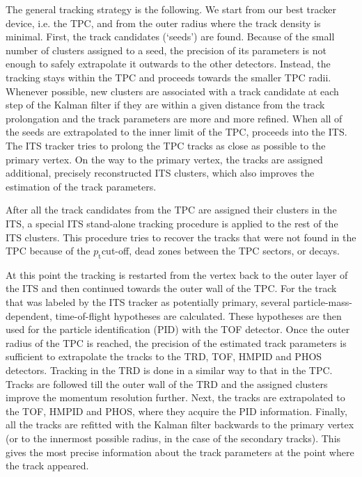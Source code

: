 \documentclass[12pt,a4paper,twoside]{article}
\newcommand{\pt}{\ensuremath{p_{\mathrm{t}}}}
\begin{document}
The general tracking strategy is the following. We start from our
best tracker device, i.e. the TPC, and from the outer radius where the
track density is minimal. First, the track candidates (`seeds') are
found. Because of the small number of clusters assigned to a seed, the 
precision of its parameters is not enough to safely extrapolate it outwards
to the other detectors. Instead, the tracking stays within the TPC and 
proceeds towards the smaller TPC radii. Whenever
possible, new clusters are associated with a track candidate
at each step of the Kalman filter if they are within a given distance
from the track prolongation and the track parameters are more and 
more refined.  When all of the seeds are extrapolated to the inner limit of 
the TPC, proceeds into the ITS.  The ITS tracker tries to prolong
the TPC tracks as close as possible to the primary vertex.
On the way to the primary vertex, the tracks  are assigned additional, 
precisely reconstructed ITS clusters, which also improves 
the estimation of the track parameters.

After all the track candidates from the TPC are assigned their clusters 
in the ITS, a special ITS stand-alone tracking procedure is applied to 
the rest of the ITS clusters.  This procedure tries to recover the
tracks that were not found in the TPC because of the \pt cut-off, dead zones
between the TPC sectors, or decays.    

At this point the tracking is restarted from the vertex back to the
outer layer of the ITS and then continued towards the outer wall of the
TPC.  For the track that was labeled by the ITS tracker as potentially
primary,  several particle-mass-dependent, time-of-flight hypotheses 
are calculated.  These hypotheses are then used for the particle
identification (PID) with the TOF detector. Once the outer 
radius of the TPC is reached, the precision of the estimated track
parameters is
sufficient to extrapolate the tracks to the TRD, TOF, HMPID and PHOS
detectors.  Tracking in the TRD is done in a similar way to that
in the TPC. Tracks are followed till the outer wall of the TRD and the
assigned clusters improve the momentum resolution further.  
Next, the tracks are extrapolated to the TOF, HMPID and PHOS, where they
acquire the PID information. 
Finally, all the tracks are refitted with the Kalman filter backwards to
the primary vertex (or to the innermost possible radius, in the case of 
the secondary tracks). This gives the most precise information about
the track parameters at the point where the track appeared.
\end{document}
